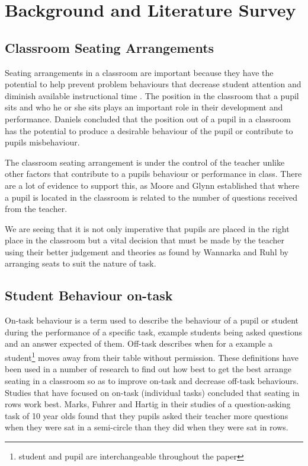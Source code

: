 \section{Background and Literature Survey}
\subsection{Classroom Seating Arrangements}
Seating arrangements in a classroom are important because they have the potential to help prevent problem behaviours that decrease student attention and diminish available instructional time \cite{wannarka2008seating}. The position in the classroom that a pupil sits and who he or she sits plays an important role in their development and performance. Daniels \cite{daniels1998manage} concluded that the position out of a pupil in a classroom has the potential to produce a desirable behaviour of the pupil or contribute to pupils misbehaviour.

The classroom seating arrangement is under the control of the teacher unlike other factors that contribute to a pupils behaviour or performance in class. There are a lot of evidence to support this, as Moore and Glynn \cite{moore1984variation} established that where a pupil is located in the classroom is related to the number of questions received from the teacher.

We are seeing that it is not only imperative that pupils are placed in the right place in the classroom but a vital decision that must be made by the teacher using their better judgement and theories as found by Wannarka and Ruhl \cite{wannarka2008seating} by arranging seats to suit the nature of task.

\subsection{Student Behaviour on-task}
On-task behaviour is a term used to describe the behaviour of a pupil or student during the performance of a specific task, example students being asked questions and an answer expected of them. Off-task describes when for a example a student\footnote{student and pupil are interchangeable throughout the paper} moves away from their table without permission. These definitions have been used in a number of research to find out how best to get the best arrange seating in a classroom so as to improve on-task and decrease off-task behaviours. Studies that have focused on on-task (individual tasks) concluded that seating in rows work best. Marks, Fuhrer and Hartig \cite{marx1999effects} in their studies of a question-asking task of 10 year olds found that they pupils asked their teacher more questions when they were sat in a semi-circle than they did when they were sat in rows.

